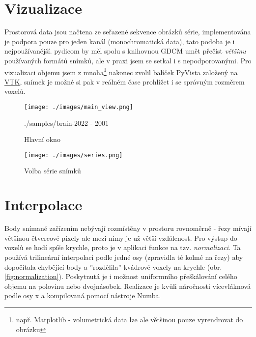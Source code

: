 \documentclass[czech]{pyt-report}
\begin{document}
\section{Vizualizace}
\label{sec:vizualizace}
Prostorová data jsou načtena ze seřazené sekvence obrázků série, implementována je podpora pouze pro jeden kanál (monochromatická data), tato podoba je i nejpoužívanější. pydicom by měl spolu s knihovnou GDCM umět přečíst \emph{většinu} používaných formátů snímků\cite{bib:pydicom-formats}, ale v praxi jsem se setkal i s nepodporovanými. Pro vizualizaci objemu jsem z mnoha\footnote{např. Matplotlib - volumetrická data lze ale většinou pouze vyrendrovat do obrázku} nakonec zvolil balíček PyVista\cite{bib:pyvista-volumes} založený na \href{https://vtk.org/}{VTK}, snímek je možné si pak v reálném čase prohlížet i se správným rozměrem voxelů.

\begin{figure}[h]
  \centering\leavevmode
  \texttt{[image: ./images/main\_view.png]}\vskip-0.5cm
  \medskip
  \caption{Hlavní okno}
  \smallskip
  \tiny ./samples/brain-2022 - 2001
  \label{fig:main_view}
\end{figure}

\begin{figure}[h]
  \centering\leavevmode
  \texttt{[image: ./images/series.png]}\vskip-0.5cm
  \medskip
  \caption{Volba série snímků}
  \label{fig:series}
\end{figure}

\section{Interpolace}
\label{sec:interpolace}
Body snímané zařízením nebývají rozmístěny v prostoru rovnoměrně - řezy mívají většinou čtvercové pixely ale mezi nimy je už větší vzdálenost. Pro výstup do voxelů se hodí spíše krychle, proto je v aplikaci funkce na tzv. \emph{normalizaci}. Ta používá trilineární interpolaci\cite{bib:wiki-trilinear_interpolation} podle jedné osy (zpravidla té kolmé na řezy) aby dopočítala chybějící body a ''rozdělila'' kvádrové voxely na krychle (obr. \ref{fig:normalization}). Poskytnutá je i možnost uniformního přeškálování celého objemu na polovinu nebo dvojnásobek. Realizace je kvůli náročnosti vícevláknová podle osy x a kompilovaná pomocí nástroje Numba\cite{bib:numba}.
\end{document}
